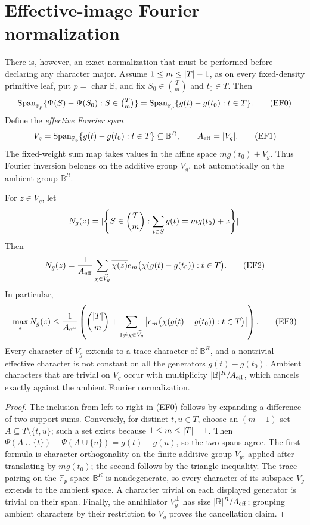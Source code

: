 \documentclass[11pt,a4paper]{amsart}
\numberwithin{equation}{section}
\theoremstyle{remark}
\newcommand{\F}{\mathbb F}\newcommand{\B}{\mathbb B}\newcommand{\K}{\mathbb K}\newcommand{\Z}{\mathbb Z}
\begin{document}
\section{Effective-image Fourier normalization}\label{sec:partial-occupancy}
There is, however, an exact normalization that must be performed before
declaring any character major.  Assume \(1\le m\le\lvert T\rvert-1\), as on every
fixed-density primitive leaf, put \(p=\operatorname{char}\B\), and fix
\(S_0\in\binom Tm\) and \(t_0\in T\).
Then
\[
 \Span_{\F_p}\{\Psi(S)-\Psi(S_0):S\in\tbinom Tm\}
 =\Span_{\F_p}\{g(t)-g(t_0):t\in T\}.               \tag{EF0}
\]
Define the \emph{effective Fourier span}
\[
 V_g=\Span_{\F_p}\{g(t)-g(t_0):t\in T\}\subseteq\B^R,
 \qquad A_{\rm eff}=\abs{V_g}.
 \tag{EF1}\label{eq:effective-fourier-span}
\]
The fixed-weight sum map takes values in the affine space
\(m g(t_0)+V_g\).  Thus Fourier inversion belongs on the additive group
\(V_g\), not automatically on the ambient group \(\B^R\).

\begin{lemma}
\label{lem:effective-span-fourier}
For \(z\in V_g\), let
\[
 N_g(z)=\lvert \left\{S\in\binom Tm:
       \sum_{t\in S}g(t)=m g(t_0)+z\right\}\rvert.
\]
Then
\[
 N_g(z)=\frac1{A_{\rm eff}}
 \sum_{\chi\in\widehat{V_g}}\overline{\chi(z)}
 e_m\bigl(\chi(g(t)-g(t_0)):t\in T\bigr).           \tag{EF2}
\]
In particular,
\[
 \max_zN_g(z)\le\frac1{A_{\rm eff}}
 \left(\binom{\lvert T\rvert}m+
 \sum_{1\ne\chi\in\widehat{V_g}}
 \left|e_m\bigl(\chi(g(t)-g(t_0)):t\in T\bigr)\right|\right). \tag{EF3}
\]
Every character of \(V_g\) extends to a trace character of \(\B^R\),
and a nontrivial effective character is not constant on all the generators
\(g(t)-g(t_0)\).  Ambient characters that are trivial on \(V_g\) occur
with multiplicity \(\abs{\B}^R/A_{\rm eff}\), which cancels exactly
against the ambient Fourier normalization.
\end{lemma}

\begin{proof}
The inclusion from left to right in \textup{(EF0)} follows by expanding a
difference of two support sums.  Conversely, for distinct \(t,u\in T\),
choose an \((m-1)\)-set \(A\subseteq T\setminus\{t,u\}\); such a set
exists because \(1\le m\le\lvert T\rvert-1\).  Then
\(\Psi(A\cup\{t\})-\Psi(A\cup\{u\})=g(t)-g(u)\), so the two spans agree.
The first formula is character orthogonality on the finite additive group
\(V_g\), applied after translating by \(m g(t_0)\); the second follows by
the triangle inequality.  The trace pairing on the \(\F_p\)-space
\(\B^R\) is nondegenerate, so every character of its subspace \(V_g\)
extends to the ambient space.  A character trivial on each displayed
generator is trivial on their span.  Finally, the annihilator
\(V_g^\perp\) has size \(\abs{\B}^R/A_{\rm eff}\); grouping ambient
characters by their restriction to \(V_g\) proves the cancellation claim.
\end{proof}
\end{document}
